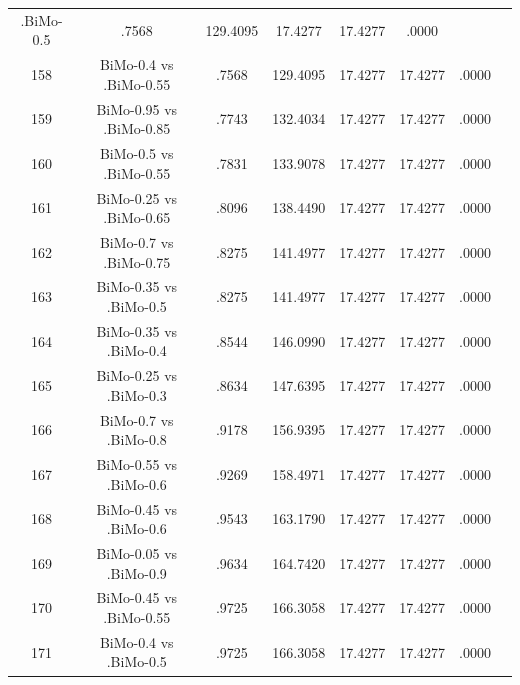 \documentclass[a4paper,10pt]{article}
\begin{document}
\begin{landscape}
\begin{table}[!htp]
\begin{tabular}{cccccccc}
.BiMo-0.5&.7568&129.4095&17.4277&17.4277&.0000\\158&BiMo-0.4 vs .BiMo-0.55&.7568&129.4095&17.4277&17.4277&.0000\\159&BiMo-0.95 vs .BiMo-0.85&.7743&132.4034&17.4277&17.4277&.0000\\160&BiMo-0.5 vs .BiMo-0.55&.7831&133.9078&17.4277&17.4277&.0000\\161&BiMo-0.25 vs .BiMo-0.65&.8096&138.4490&17.4277&17.4277&.0000\\162&BiMo-0.7 vs .BiMo-0.75&.8275&141.4977&17.4277&17.4277&.0000\\163&BiMo-0.35 vs .BiMo-0.5&.8275&141.4977&17.4277&17.4277&.0000\\164&BiMo-0.35 vs .BiMo-0.4&.8544&146.0990&17.4277&17.4277&.0000\\165&BiMo-0.25 vs .BiMo-0.3&.8634&147.6395&17.4277&17.4277&.0000\\166&BiMo-0.7 vs .BiMo-0.8&.9178&156.9395&17.4277&17.4277&.0000\\167&BiMo-0.55 vs .BiMo-0.6&.9269&158.4971&17.4277&17.4277&.0000\\168&BiMo-0.45 vs .BiMo-0.6&.9543&163.1790&17.4277&17.4277&.0000\\169&BiMo-0.05 vs .BiMo-0.9&.9634&164.7420&17.4277&17.4277&.0000\\170&BiMo-0.45 vs .BiMo-0.55&.9725&166.3058&17.4277&17.4277&.0000\\171&BiMo-0.4 vs .BiMo-0.5&.9725&166.3058&17.4277&17.4277&.0000\\\hline
\end{tabular}
\end{table}

\end{landscape}
\end{document}

